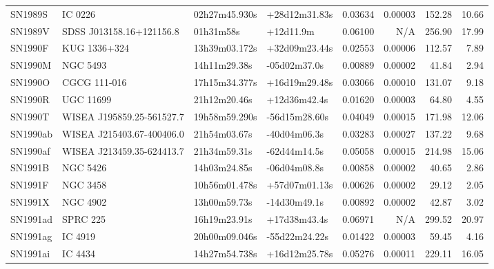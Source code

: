 \begin{longtable}{llllrrrr}
SN1989S          &                         IC 0226 &   02h27m45.930s &   +28d12m31.83s &  0.03634 &  0.00003 &   152.28 &       10.66 \\
SN1989V          &        SDSS J013158.16+121156.8 &       01h31m58s &       +12d11.9m &  0.06100 &      N/A &   256.90 &       17.99 \\
SN1990F          &                    KUG 1336+324 &   13h39m03.172s &   +32d09m23.44s &  0.02553 &  0.00006 &   112.57 &        7.89 \\
SN1990M          &                        NGC 5493 &    14h11m29.38s &    -05d02m37.0s &  0.00889 &  0.00002 &    41.84 &        2.94 \\
SN1990O          &                    CGCG 111-016 &   17h15m34.377s &   +16d19m29.48s &  0.03066 &  0.00010 &   131.07 &        9.18 \\
SN1990R          &                       UGC 11699 &    21h12m20.46s &    +12d36m42.4s &  0.01620 &  0.00003 &    64.80 &        4.55 \\
SN1990T          &       WISEA J195859.25-561527.7 &   19h58m59.290s &   -56d15m28.60s &  0.04049 &  0.00015 &   171.98 &       12.06 \\
SN1990ab         &       WISEA J215403.67-400406.0 &    21h54m03.67s &    -40d04m06.3s &  0.03283 &  0.00027 &   137.22 &        9.68 \\
SN1990af         &       WISEA J213459.35-624413.7 &    21h34m59.31s &    -62d44m14.5s &  0.05058 &  0.00015 &   214.98 &       15.06 \\
SN1991B          &                        NGC 5426 &    14h03m24.85s &    -06d04m08.8s &  0.00858 &  0.00002 &    40.65 &        2.86 \\
SN1991F          &                        NGC 3458 &   10h56m01.478s &   +57d07m01.13s &  0.00626 &  0.00002 &    29.12 &        2.05 \\
SN1991X          &                        NGC 4902 &    13h00m59.73s &    -14d30m49.1s &  0.00892 &  0.00002 &    42.87 &        3.02 \\
SN1991ad         &                        SPRC 225 &    16h19m23.91s &    +17d38m43.4s &  0.06971 &      N/A &   299.52 &       20.97 \\
SN1991ag         &                         IC 4919 &   20h00m09.046s &   -55d22m24.22s &  0.01422 &  0.00003 &    59.45 &        4.16 \\
SN1991ai         &                         IC 4434 &   14h27m54.738s &   +16d12m25.78s &  0.05276 &  0.00011 &   229.11 &       16.05 \\

\end{longtable}
